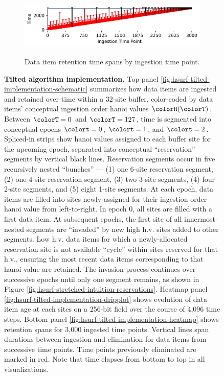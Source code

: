 \begin{figure}[h!]
   \begin{minipage}[]{\textwidth}
   \vspace{-2pt}
  \begin{subfigure}[t]{0.7\linewidth}
  \vspace{0pt}
    \centering
    \includegraphics[width=0.88\linewidth,clip]{binder/teeplots/21/num-generations=262144+surface-size=64+viz=stratum-persistence-dripplot+ext=}
  \end{subfigure}%
  \begin{subfigure}[t]{0.3\linewidth}
  \vspace{-2pt}
  \caption{%
    Data item retention time spans by ingestion time point.
  }
  \end{subfigure}
  \end{minipage}

\vspace{-2ex}\caption{%
  \textbf{Tilted algorithm implementation.}
  \footnotesize
  Top panel \ref{fig:hsurf-tilted-implementation-schematic} summarizes how data items are ingested and retained over time within a 32-site buffer, color-coded by data items' conceptual ingestion order hanoi values $\colorH(\colorT)$.
  Between $\colorT=0$ and $\colorT=127$, time is segmented into conceptual epochs $\colort=0$, $\colort=1$, and $\colort=2$.
  Spliced-in strips show hanoi values assigned to each buffer site for the upcoming epoch, separated into conceptual ``reservation'' segments by vertical black lines.
  Reservation segments occur in five recursively nested ``bunches'' --- (1) one 6-site reservation segment, (2) one 4-site reservation segment, (3) two 3-site segments, (4) four 2-site segments, and (5) eight 1-site segments.
  At each epoch, data items are filled into sites newly-assigned for their ingestion-order hanoi value from left-to-right.
  In epoch 0, all sites are filled with a first data item.
  At subsequent epochs, the first site of all innermost-nested segments are ``invaded'' by new high h.v. sites added to other segments.
  Low h.v. data items for which a newly-allocated reservation site is not available ``cycle'' within sites reserved for that h.v., ensuring the most recent data items corresponding to that hanoi value are retained.
  The invasion process continues over successive epochs until only one segment remains, as shown in Figure \ref{fig:hsurf-stretched-intuition-reservations}.
  Heatmap panel \ref{fig:hsurf-tilted-implementation-dripplot} shows evolution of data item age at each sites on a 256-bit field over the course of 4,096 time steps.
  Bottom panel \ref{fig:hsurf-tilted-implementation-heatmap} shows retention spans for 3,000 ingested time points.
  Vertical lines span durations between ingestion and elimination for data items from successive time points.
  Time points previously eliminated are marked in red.
  Note that time elapses from bottom to top in all visualizations.
}
\label{fig:hsurf-tilted-implementation}

\end{figure}
